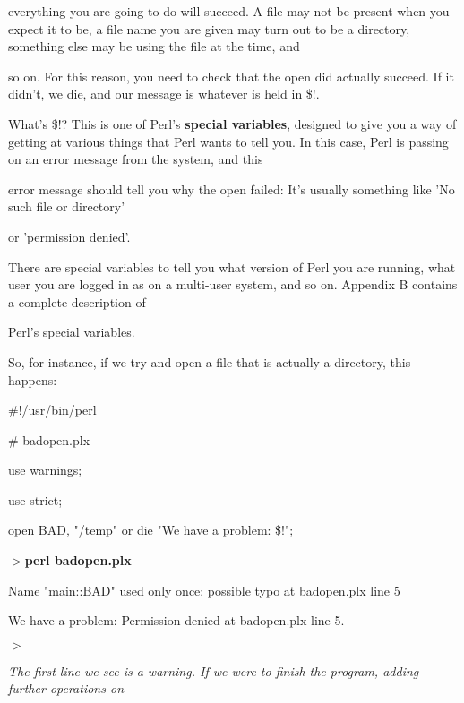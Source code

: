 \documentclass[a4paper,11pt]{book}
\begin{document}
\noindent everything you are going to do will succeed. A file may not be present when you expect it to be, a file name you are given may turn out to be a directory, something else may be using the file at the time, and

\noindent so on. For this reason, you need to check that the open did actually succeed. If it didn't, we die, and our message is whatever is held in \$!.

\noindent 

\noindent What's \$!? This is one of Perl's \textbf{special variables}, designed to give you a way of getting at various things that Perl wants to tell you. In this case, Perl is passing on an error message from the system, and this

\noindent error message should tell you why the open failed: It's usually something like 'No such file or directory'

\noindent or 'permission denied'.

\noindent 

\noindent There  are special  variables to  tell  you  what  version  of Perl  you  are running,  what  user  you  are logged  in as on a multi-user system,  and  so  on.  Appendix  B  contains  a  complete  description  of

\noindent Perl's special variables.

\noindent 

\noindent 

\noindent So,  for instance, if we try and open a file that is actually a directory, this happens:

\noindent 

\noindent \#!/usr/bin/perl

\noindent \# badopen.plx

\noindent use warnings;

\noindent use strict;

\noindent open BAD, "/temp" or die "We have a problem: \$!";

\noindent 

\noindent $>$\textbf{perl badopen.plx}

\noindent Name "main::BAD" used only once: possible typo at badopen.plx line 5

\noindent We have a problem: Permission denied at badopen.plx line 5.

\noindent $>$

\noindent 

\noindent \textit{The first line we see is a warning. If we were to finish the program, adding further operations on}
\end{document}
